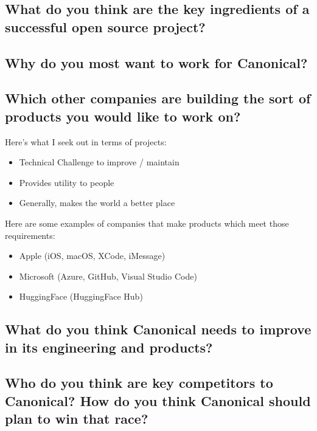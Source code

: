 \documentclass{article}
\begin{document}
\subsection{What do you think are the key ingredients of a successful open source project?}
\subsection{Why do you most want to work for Canonical?}
\subsection{Which other companies are building the sort of products you would like to work on?}
Here's what I seek out in terms of projects:
\begin{itemize}
    \item Technical Challenge to improve / maintain
    \item Provides utility to people
    \item Generally, makes the world a better place
\end{itemize}
Here are some examples of companies that make products which meet those requirements:
\begin{itemize}
    \item Apple (iOS, macOS, XCode, iMessage)
    \item Microsoft (Azure, GitHub, Visual Studio Code)
    \item HuggingFace (HuggingFace Hub)
\end{itemize}
\subsection{What do you think Canonical needs to improve in its engineering and products?}
\subsection{Who do you think are key competitors to Canonical? How do you think Canonical should plan to win that race?}
\end{document}
